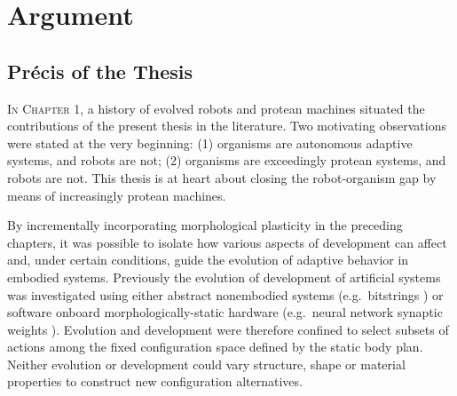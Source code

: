 







\chapter{Argument}


\section{Pr\'{e}cis of the Thesis}

\textsc{In Chapter 1,}
a history of 
evolved robots 
and protean machines 
situated the contributions of the present thesis in the literature.
Two motivating observations were stated at the very beginning:
(1) organisms are autonomous adaptive systems, and robots are not;
(2) organisms are exceedingly protean systems, and robots are not.
This thesis is at heart about closing the robot-organism gap by means of increasingly protean machines.


By incrementally incorporating morphological plasticity in the preceding chapters, it was possible to isolate how various aspects of development can affect and, under certain conditions, guide the evolution of adaptive behavior in embodied systems.
Previously the evolution of development of artificial systems was investigated using either abstract nonembodied systems (e.g.~bitstrings \cite{hinton1987learning})
or software onboard morphologically-static hardware
(e.g.~neural network synaptic weights \cite{husbands1998better,floreano1996plastic}).
Evolution and development were therefore confined to select subsets of actions among the fixed configuration space defined by the static body plan.
Neither evolution or development could vary structure, shape or material properties to construct new configuration alternatives.

